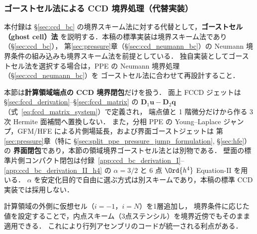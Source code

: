 \subsubsection{ゴーストセル法による CCD 境界処理（代替実装）}
\label{app:ccd_ghost}

本付録は §\ref{sec:ccd_bc} の境界スキーム法に対する代替として，\textbf{ゴーストセル（ghost cell）法}
を説明する．本稿の標準実装は境界スキーム法であり（§\ref{sec:ccd_bc}），
第\ref{sec:pressure}章（§\ref{sec:ccd_neumann_bc}）の Neumann 境界条件の組み込みも境界スキーム法を前提としている．
独自実装としてゴーストセル法を選択する場合は，PPE の Neumann 境界処理（§\ref{sec:ccd_neumann_bc}）を
ゴーストセル法に合わせて再設計すること．

\begin{tcolorbox}[warnbox, title={本付録 C.2 の適用範囲}]
本節は\textbf{計算領域端点の CCD 境界閉包}だけを扱う．
面上 FCCD ジェットは §\ref{sec:fccd_derivation}--§\ref{sec:fccd_matrix} の
$\mathbf{D}_1\mathbf{u}-\mathbf{D}_2\mathbf{q}$（式~\eqref{eq:fccd_matrix_system}）で定義され，
端点値と 1 階微分だけから作る 3 次 Hermite 面補間へ置換しない．
また，分相 PPE の Young--Laplace ジャンプ，GFM/HFE による片側場延長，および界面ゴーストジェットは
第\ref{sec:pressure}章（特に §\ref{sec:split_ppe_pressure_jump_formulation}, §\ref{sec:hfe}）の
\textbf{界面閉包}であり，本節の領域境界ゴーストセル法とは別物である．
壁面の標準片側コンパクト閉包は付録~\ref{app:ccd_bc_derivation_I}--\ref{app:ccd_bc_derivation_II_h4} の
$\alpha=3/2$ と 6 点 $\Ord{h^4}$ Equation-II を用いる．
$\alpha$ を安定化目的で自由に選ぶ方式は別スキームであり，本稿の標準 CCD 実装では採用しない．
\end{tcolorbox}

計算領域の外側に仮想セル（$i = -1$，$i = N$）を1層追加し，
境界条件に応じた値を設定することで，内点スキーム（3点ステンシル）を境界近傍でもそのまま適用できる．
これにより行列アセンブリのコードが統一される利点がある．

